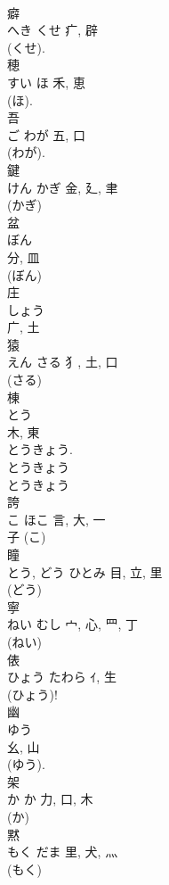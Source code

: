 \documentclass[8pt]{extreport}
\begin{document}
\begin{CJK}{UTF8}{min}
\\	癖	
\\	へき	くせ	疒, 辟	
\\	(くせ). 
\\	穂	
\\	すい	ほ	禾, 恵	
\\	(ほ). 
\\	吾	
\\	ご	わが	五, 口	
\\	(わが). 
\\	鍵	
\\	けん	かぎ	金, 廴, 聿	
\\	(かぎ) 
\\	盆	
\\	ぼん	
\\	分, 皿	
\\	(ぼん) 
\\	庄	
\\	しょう	
\\	广, 土	
\\	猿	
\\	えん	さる	犭, 土, 口		
\\	(さる) 
\\	棟	
\\	とう	
\\	木, 東	
\\	とうきょう. 
\\	とうきょう 
\\	とうきょう 
\\	誇	
\\	こ	ほこ	言, 大, 一		
\\	子 (こ) 
\\	瞳	
\\	とう, どう	ひとみ	目, 立, 里	
\\	(どう) 
\\	寧	
\\	ねい	むし	宀, 心, 罒, 丁	
\\	(ねい) 
\\	俵	
\\	ひょう	たわら	ｲ, 生		
\\	(ひょう)! 
\\	幽	
\\	ゆう	
\\	幺, 山	
\\	(ゆう). 
\\	架	
\\	か	か	力, 口, 木	
\\	(か) 
\\	黙	
\\	もく	だま	里, 犬, 灬	
\\	(もく) 

\end{CJK}
\end{document}

